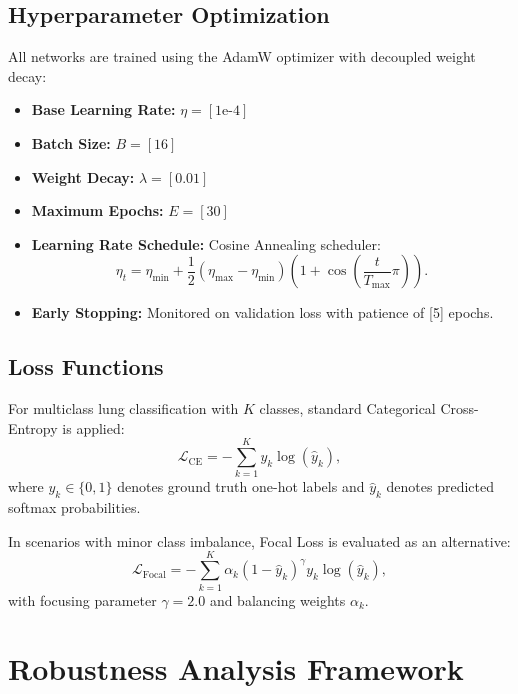 \documentclass[conference]{IEEEtran}
\begin{document}
\subsection{Hyperparameter Optimization}
All networks are trained using the AdamW optimizer with decoupled weight decay:
\begin{itemize}
    \item \textbf{Base Learning Rate:} $\eta = [\text{1e-4}]$
    \item \textbf{Batch Size:} $B = [\text{16}]$
    \item \textbf{Weight Decay:} $\lambda = [\text{0.01}]$
    \item \textbf{Maximum Epochs:} $E = [\text{30}]$
    \item \textbf{Learning Rate Schedule:} Cosine Annealing scheduler:
      \begin{equation}
      \eta_t = \eta_{\text{min}} + \frac{1}{2}(\eta_{\text{max}} - \eta_{\text{min}})\left(1 + \cos\left(\frac{t}{T_{\text{max}}}\pi\right)\right).
      \end{equation}
    \item \textbf{Early Stopping:} Monitored on validation loss with patience of [5] epochs.
\end{itemize}

\subsection{Loss Functions}
For multiclass lung classification with $K$ classes, standard Categorical Cross-Entropy is applied:
\begin{equation}
\mathcal{L}_{\text{CE}} = - \sum_{k=1}^K y_k \log(\hat{y}_k),
\end{equation}
where $y_k \in \{0, 1\}$ denotes ground truth one-hot labels and $\hat{y}_k$ denotes predicted softmax probabilities. 

In scenarios with minor class imbalance, Focal Loss \cite{lin2017focal} is evaluated as an alternative:
\begin{equation}
\mathcal{L}_{\text{Focal}} = - \sum_{k=1}^K \alpha_k (1 - \hat{y}_k)^\gamma y_k \log(\hat{y}_k),
\end{equation}
with focusing parameter $\gamma = 2.0$ and balancing weights $\alpha_k$.

\section{Robustness Analysis Framework}
\label{sec:robustness}
\end{document}
